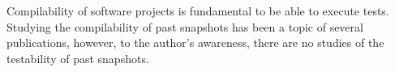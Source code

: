 Compilability of software projects is fundamental to be able to execute tests. %
Studying the compilability of past snapshots has been a topic of several publications, however, to the author's awareness, there are no studies of the testability of past snapshots. 



